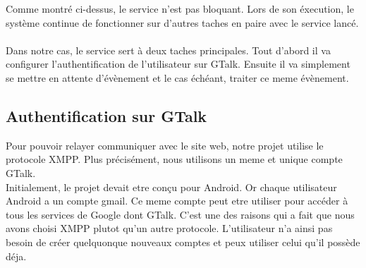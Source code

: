 Comme montré ci-dessus, le service n'est pas  bloquant. Lors de son éxecution, le système continue de 
fonctionner sur d'autres taches en paire avec le service lancé.
\\\\
Dans notre cas, le service sert à deux taches principales. Tout d'abord il va configurer l'authentification
de l'utilisateur sur GTalk. Ensuite il va simplement se mettre en attente d'évènement et le cas échéant, 
traiter ce meme évènement.




\subsection{Authentification sur GTalk}



Pour pouvoir relayer communiquer avec le site web, notre projet utilise le protocole XMPP. Plus 
précisément, nous utilisons un meme et unique compte GTalk. 
\\
Initialement, le projet devait etre conçu pour Android. Or chaque utilisateur Android a un compte 
gmail. Ce meme compte peut etre utiliser pour accéder à tous les services de Google dont GTalk.
C'est une des raisons qui a fait que nous avons choisi XMPP plutot qu'un autre protocole. L'utilisateur
n'a ainsi pas besoin de créer quelquonque nouveaux comptes et peux utiliser celui qu'il possède déja.
\\\\

